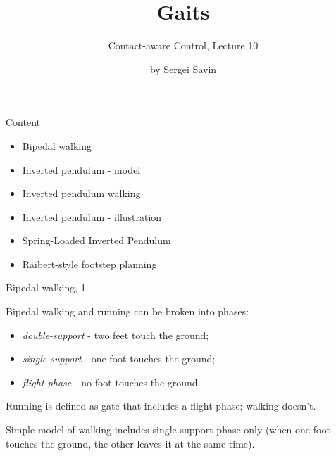 \documentclass{beamer}
\title{Gaits}
\subtitle{Contact-aware Control, Lecture 10}
\author{by Sergei Savin}
\date{\mydate}
\begin{document}
\maketitle


\begin{frame}{Content}

\begin{itemize}
\item Bipedal walking
\item Inverted pendulum - model
\item Inverted pendulum walking
\item Inverted pendulum - illustration
\item Spring-Loaded Inverted Pendulum
\item Raibert-style footstep planning
\end{itemize}

\end{frame}




\begin{frame}{Bipedal walking, 1}
	\begin{flushleft}
		
		Bipedal walking and running can be broken into phases:
		
		\begin{itemize}
			\item \emph{double-support} - two feet touch the ground;
			
			\item \emph{single-support} - one foot touches the ground;
			
			\item \emph{flight phase} - no foot touches the ground.
		\end{itemize}
		
		\bigskip
		
		 Running is defined as gate that includes a flight phase; walking doesn't.
		
		\bigskip
		
		Simple model of walking includes single-support phase only (when one foot touches the ground, the other leaves it at the same time).
		
	\end{flushleft}
\end{frame}
\end{document}
